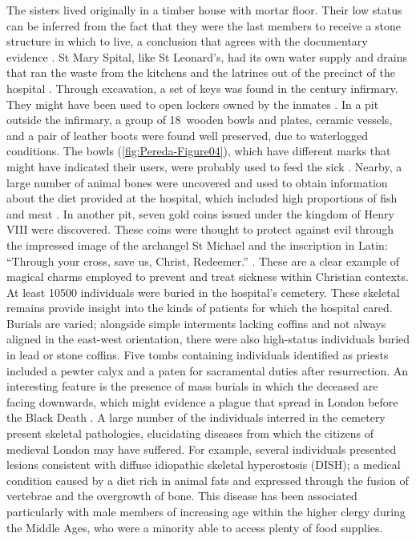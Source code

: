 \documentclass[%
	]{ijsra}
\begin{document}
The sisters lived originally in a timber house with mortar floor. Their low status can be inferred from the fact that they were the last members to receive a stone structure in which to live, a conclusion that agrees with the documentary evidence \parencites[36]{Phillpotts_1997}[51]{Rawcliffe_1999}[151]{Thomas_2002}.
St Mary Spital, like St Leonard’s, had its own water supply and drains that ran the waste from the kitchens and the latrines out of the precinct of the hospital \parencite[151]{Thomas_2002}. 
\IJSRAseparator
{}
Through excavation, a set of keys was found in the  century infirmary. They might have been used to open lockers owned by the inmates \parencite[99]{Thomas_2002}. In a pit outside the infirmary, a group of 18~wooden bowls and plates, ceramic vessels, and a pair of leather boots were found well preserved, due to waterlogged conditions. The bowls (\cref{fig:Pereda-Figure04}), %
which have different marks that might have indicated their users, were probably used to feed the sick \parencites[68]{Egan_2007}[99]{Thomas_2002}. 
Nearby, a large number of animal bones were uncovered and used to obtain information about the diet provided at the hospital, which included high proportions of fish and meat \parencite[59,113-114]{Phillpotts_1997}.
In another pit, seven gold coins issued under the kingdom of Henry\,VIII were discovered. These coins were thought to protect against evil through the impressed image of the archangel St Michael and the inscription in Latin: \enquote{Through your cross, save us, Christ, Redeemer.}  \parencite[70]{Egan_2007}. 
These are a clear example of magical charms employed to prevent and treat sickness within Christian contexts. 
At least \num{10500} individuals were buried in the hospital’s cemetery. These skeletal remains provide insight into the kinds of patients for which the hospital cared.  Burials are varied; alongside simple interments lacking coffins and not always aligned in the east-west orientation, there were also high-status individuals buried in lead or stone coffins. Five tombs containing individuals identified as priests included a pewter calyx and a paten for sacramental duties after resurrection. 
An interesting feature is the presence of mass burials in which the deceased are facing downwards, which might evidence a plague that spread in London before the Black Death \parencites[61]{Bowers_2007}[252]{Brodman_2009}[73]{Egan_2007}[101]{Thomas_2002}[61]{White_2007}.
A large number of the individuals interred in the cemetery present skeletal pathologies, elucidating diseases from which the citizens of medieval London may have suffered. For example, several individuals presented lesions consistent with diffuse idiopathic skeletal hyperostosis (DISH); a medical condition caused by a diet rich in animal fats and expressed through the fusion of vertebrae and the overgrowth of bone. This disease has been associated particularly with male members of increasing age within the higher clergy during the Middle Ages, who were a minority able to access plenty of food supplies. 
\end{document}
